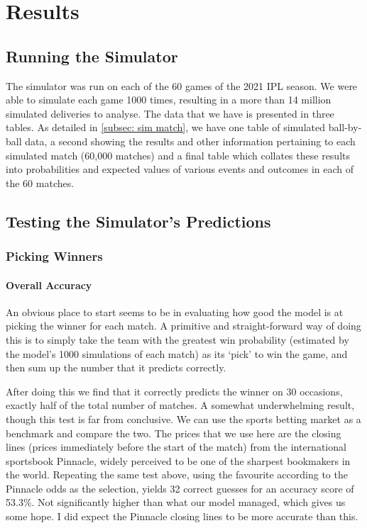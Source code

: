 \titleformat{\chapter}[hang]{\Huge\bfseries}{\thechapter\hsp\textcolor{gray75}{|}\hsp}{0pt}{\Huge\bfseries}
\chapter{Results}

\section{Running the Simulator}

The simulator was run on each of the 60 games of the 2021 IPL season. We were able to simulate each game 1000 times, resulting in a more than 14 million simulated deliveries to analyse. The data that we have is presented in three tables. As detailed in \cref{subsec: sim match}, we have one table of simulated ball-by-ball data, a second showing the results and other information pertaining to each simulated match (60,000 matches) and a final table which collates these results into probabilities and expected values of various events and outcomes in each of the 60 matches.

\section{Testing the Simulator's Predictions}

\subsection{Picking Winners}

\subsubsection{Overall Accuracy}

An obvious place to start seems to be in evaluating how good the model is at picking the winner for each match. A primitive and straight-forward way of doing this is to simply take the team with the greatest win probability (estimated by the model's 1000 simulations of each match) as its `pick' to win the game, and then sum up the number that it predicts correctly.

After doing this we find that it correctly predicts the winner on 30 occasions, exactly half of the total number of matches. A somewhat underwhelming result, though this test is far from conclusive. We can use the sports betting market as a benchmark and compare the two. The prices that we use here are the closing lines (prices immediately before the start of the match) from the international sportsbook Pinnacle\footnotemark{}, widely perceived to be one of the sharpest bookmakers in the world. \cite{norheim_closing_2017} Repeating the same test above, using the favourite according to the Pinnacle odds as the selection, yields 32 correct guesses for an accuracy score of 53.3\%. Not significantly higher than what our model managed, which gives us some hope. I did expect the Pinnacle closing lines to be more accurate than this.

